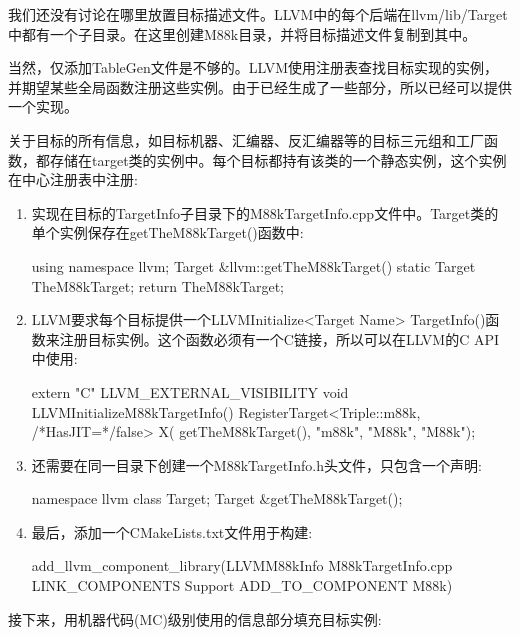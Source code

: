 我们还没有讨论在哪里放置目标描述文件。LLVM中的每个后端在llvm/lib/Target中都有一个子目录。在这里创建M88k目录，并将目标描述文件复制到其中。

当然，仅添加TableGen文件是不够的。LLVM使用注册表查找目标实现的实例，并期望某些全局函数注册这些实例。由于已经生成了一些部分，所以已经可以提供一个实现。

关于目标的所有信息，如目标机器、汇编器、反汇编器等的目标三元组和工厂函数，都存储在target类的实例中。每个目标都持有该类的一个静态实例，这个实例在中心注册表中注册:

\begin{enumerate}
\item
实现在目标的TargetInfo子目录下的M88kTargetInfo.cpp文件中。Target类的单个实例保存在getTheM88kTarget()函数中:

\begin{cpp}
using namespace llvm;
Target &llvm::getTheM88kTarget() {
    static Target TheM88kTarget;
    return TheM88kTarget;
}
\end{cpp}

\item
LLVM要求每个目标提供一个LLVMInitialize<Target Name> TargetInfo()函数来注册目标实例。这个函数必须有一个C链接，所以可以在LLVM的C API中使用:

\begin{cpp}
extern "C" LLVM_EXTERNAL_VISIBILITY void
LLVMInitializeM88kTargetInfo() {
    RegisterTarget<Triple::m88k, /*HasJIT=*/false> X(
        getTheM88kTarget(), "m88k", "M88k", "M88k");
}
\end{cpp}

\item
还需要在同一目录下创建一个M88kTargetInfo.h头文件，只包含一个声明:

\begin{cpp}
namespace llvm {
class Target;
Target &getTheM88kTarget();
}
\end{cpp}

\item
最后，添加一个CMakeLists.txt文件用于构建:

\begin{cmake}
add_llvm_component_library(LLVMM88kInfo
    M88kTargetInfo.cpp
    LINK_COMPONENTS Support
    ADD_TO_COMPONENT M88k)
\end{cmake}

\end{enumerate}

接下来，用机器代码(MC)级别使用的信息部分填充目标实例:

